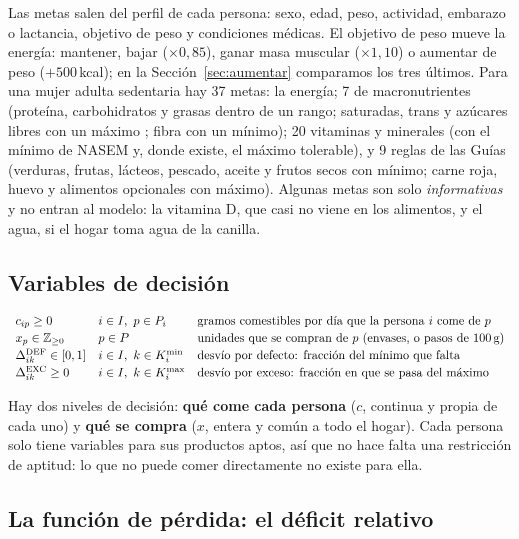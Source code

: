 \documentclass[10pt,a4paper]{article}
\newcommand{\Ddef}{\Delta^{\mathrm{DEF}}}
\newcommand{\Dexc}{\Delta^{\mathrm{EXC}}}
\begin{document}
Las metas salen del perfil de cada persona: sexo, edad, peso, actividad, embarazo o
lactancia, objetivo de peso y condiciones médicas. El objetivo de peso mueve la
energía: mantener, bajar ($\times 0{,}85$), ganar masa muscular ($\times 1{,}10$) o
aumentar de peso ($+500$\,kcal); en la Sección~\ref{sec:aumentar} comparamos los tres
últimos. Para una mujer adulta sedentaria hay 37 metas: la energía; 7 de
macronutrientes (proteína, carbohidratos y grasas dentro de un rango; saturadas,
trans y azúcares libres con un máximo \cite{oms-grasas,oms-azucares}; fibra con un
mínimo); 20 vitaminas y minerales (con el mínimo de NASEM \cite{dri} y, donde existe,
el máximo tolerable), y 9 reglas de las Guías (verduras, frutas, lácteos, pescado,
aceite y frutos secos con mínimo; carne roja, huevo y alimentos opcionales con
máximo). Algunas metas son solo \emph{informativas} y no entran al modelo: la
vitamina D, que casi no viene en los alimentos, y el agua, si el hogar toma agua de
la canilla.

\subsection{Variables de decisión}

\[
\begin{array}{lll}
c_{ip} \geq 0              & i \in I,\ p \in P_i   & \text{gramos comestibles por día que la persona } i \text{ come de } p \\[2pt]
x_p \in \mathbb{Z}_{\geq 0} & p \in P               & \text{unidades que se compran de } p \text{ (envases, o pasos de 100\,g)} \\[2pt]
\Ddef_{ik} \in [0,1]     & i \in I,\ k \in K_i^{\min} & \text{desvío por defecto: fracción del mínimo que falta} \\[2pt]
\Dexc_{ik} \geq 0        & i \in I,\ k \in K_i^{\max} & \text{desvío por exceso: fracción en que se pasa del máximo}
\end{array}
\]

Hay dos niveles de decisión: \textbf{qué come cada persona} ($c$, continua y propia
de cada uno) y \textbf{qué se compra} ($x$, entera y común a todo el hogar). Cada
persona solo tiene variables para sus productos aptos, así que no hace falta una
restricción de aptitud: lo que no puede comer directamente no existe para ella.

\subsection{La función de pérdida: el déficit relativo}
\label{sec:perdida}
\end{document}
